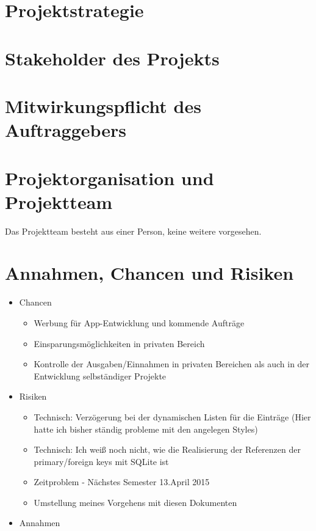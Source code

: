 \section{Projektstrategie}

\section{Stakeholder des Projekts}

\section{Mitwirkungspflicht des Auftraggebers}

\section{Projektorganisation und Projektteam}
Das Projektteam besteht aus einer Person, keine weitere vorgesehen. 

\section{Annahmen, Chancen und Risiken}
\begin{itemize}
	\item Chancen
	\begin{itemize}
		\item Werbung für App-Entwicklung und kommende Aufträge
		\item Einsparungsmöglichkeiten in privaten Bereich
		\item Kontrolle der Ausgaben/Einnahmen in privaten Bereichen als auch in der Entwicklung selbständiger Projekte
	\end{itemize}
	\item Risiken
	\begin{itemize}
		\item Technisch: Verzögerung bei der dynamischen Listen für die Einträge (Hier hatte ich bisher ständig probleme mit den angelegen Styles)
		\item Technisch: Ich weiß noch nicht, wie die Realisierung der Referenzen der primary/foreign keys mit SQLite ist
		\item Zeitproblem - Nächstes Semester 13.April 2015
		\item Umstellung meines Vorgehens mit diesen Dokumenten
	\end{itemize}
	\item Annahmen
\end{itemize}
